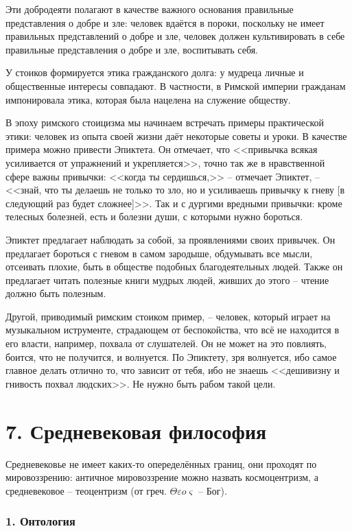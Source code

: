 \documentclass[a4paper, 12pt]{book} %
\begin{document}
Эти добродеяти полагают в качестве важного основания правильные представления о добре и зле: человек вдаётся в пороки, поскольку не имеет правильных представлений о добре и зле, человек должен культивировать в себе правильные представления о добре и зле, воспитывать себя.


У стоиков формируется этика гражданского долга: у мудреца личные и общественные интересы совпадают. В частности, в Римской империи гражданам импонировала этика, которая была нацелена на служение обществу. 

В эпоху римского стоицизма мы начинаем встречать примеры практической этики: человек из опыта своей жизни даёт некоторые советы и уроки. В качестве примера можно привести Эпиктета. Он отмечает, что <<привычка всякая усиливается от упражнений и укрепляется>>, точно так же в нравственной сфере важны привычки: <<когда ты сердишься,>> -- отмечает Эпиктет, --  <<знай, что ты делаешь не только то зло, но и усиливаешь привычку к гневу [в следующий раз будет сложнее]>>. Так и с дургими вредными привычки: кроме телесных болезней, есть и болезни души, с которыми нужно бороться.

 Эпиктет предлагает наблюдать за собой, за проявлениями своих привычек. Он предлагает бороться с гневом в самом зародыше, обдумывать все мысли, отсеивать плохие, быть в обществе подобных благодеятельных людей. Также он предлагает читать полезные книги мудрых людей, живших до этого -- чтение должно быть полезным.
 
Другой, приводимый римским стоиком пример, -- человек, который играет на музыкальном иструменте, страдающем от беспокойства, что всё не находится в его власти, например, похвала от слушателей. Он не может на это повлиять, боится, что не получится, и волнуется. По Эпиктету, зря волнуется, ибо самое главное делать отлично то, что зависит от тебя, ибо не знаешь <<дешивизну и гнивость похвал людских>>. Не нужно быть рабом такой цели.

\section*{7. Средневековая философия}

Средневековье не имеет каких-то опеределённых границ, они проходят по мировоззрению: античное мировоззрение можно назвать космоцентризм, а средневековое -- теоцентризм (от греч. $\Theta \varepsilon o \varsigma $ -- Бог). 


\subsubsection*{1. Онтология}
\end{document}
